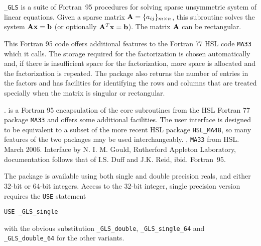 \documentclass{galahad}
\newcommand{\packagename}{GLS}
\newcommand{\fullpackagename}{\libraryname\_\packagename}
\begin{document}
\galheader


\galsummary

{\tt \fullpackagename} is a suite of Fortran~95 procedures 
for solving sparse unsymmetric system of linear equations. Given
a sparse matrix ${\mathbf{A}} = \{a_{ij}\}_{m \times n}$, this
subroutine solves the system ${\mathbf{A}} {\mathbf{x}} = {\mathbf{b}}$ (or optionally
${\mathbf{A}}^T {\mathbf{x}} = {\mathbf{b}}$).
The matrix ${\mathbf{A}}$ can be rectangular. 

This Fortran 95 code offers additional features to the Fortran 77 HSL code 
{\tt MA33} which it calls. The storage required for the factorization is chosen
automatically and, if there is insufficient space for the factorization,
more space is allocated and the factorization is repeated.  The package
also returns the number of entries in the factors and has facilities
for identifying the rows and columns that are treated specially 
when the matrix is singular or rectangular.


\galattributes
\galversions{\tt  \fullpackagename\_single, \fullpackagename\_double}.
\galremark {\tt GALAHAD\_\packagename} is a Fortran 95 encapsulation of 
the core subroutines from the HSL Fortran 77 package {\tt MA33} and offers some 
additional facilities.  The user interface is designed to be
equivalent to a subset of the more recent HSL package {\tt HSL\_MA48}, 
so many features of the two packages may be used interchangeably.
, {\tt MA33} from HSL.
\galdate March 2006.
\galorigin Interface by N. I. M. Gould, Rutherford Appleton Laboratory,
documentation follows that of I.S. Duff and J.K. Reid, ibid.
\gallanguage Fortran~95. 


\galhowto

The package is available using both single and double precision reals, 
and either 32-bit or 64-bit integers. Access to the 32-bit integer,
single precision version requires the {\tt USE} statement
\medskip

\hspace{8mm} {\tt USE \fullpackagename\_single}

\medskip
\noindent
with the obvious substitution {\tt \fullpackagename\_double},
{\tt \fullpackagename\_single\_64} and 
{\tt \fullpackagename\_double\_64} for the other variants.
\end{document}
